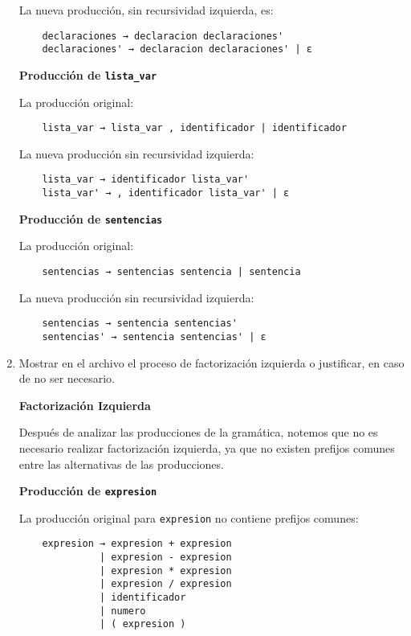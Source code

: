 \documentclass{article}
\begin{document}
\begin{enumerate}
    La nueva producción, sin recursividad izquierda, es:

    \begin{verbatim}
    declaraciones → declaracion declaraciones'
    declaraciones' → declaracion declaraciones' | ε
    \end{verbatim}

    \textbf{Producción de \texttt{lista\_var}}

    La producción original:

    \begin{verbatim}
    lista_var → lista_var , identificador | identificador
    \end{verbatim}

    La nueva producción sin recursividad izquierda:

    \begin{verbatim}
    lista_var → identificador lista_var'
    lista_var' → , identificador lista_var' | ε
    \end{verbatim}

    \textbf{Producción de \texttt{sentencias}}

    La producción original:

    \begin{verbatim}
    sentencias → sentencias sentencia | sentencia
    \end{verbatim}

    La nueva producción sin recursividad izquierda:

    \begin{verbatim}
    sentencias → sentencia sentencias'
    sentencias' → sentencia sentencias' | ε
    \end{verbatim}

    \item Mostrar en el archivo el proceso de factorización izquierda o justificar, en caso de no ser necesario.

    \textbf{Factorización Izquierda}

    Después de analizar las producciones de la gramática, notemos que no es necesario realizar factorización izquierda, ya que no existen prefijos comunes entre las alternativas de las producciones.

    \textbf{Producción de \texttt{expresion}}

    La producción original para \texttt{expresion} no contiene prefijos comunes:

    \begin{verbatim}
    expresion → expresion + expresion
              | expresion - expresion
              | expresion * expresion
              | expresion / expresion
              | identificador
              | numero
              | ( expresion )
    \end{verbatim}


\end{enumerate}
\end{document}
